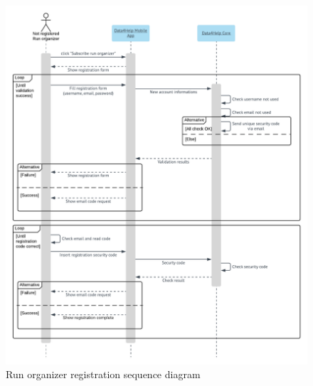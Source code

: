 \begin{figure}[H]
  \includegraphics[width=\textwidth,height=\textheight,keepaspectratio]{assets/sequence/RunOrganizerRegistration.pdf}
  \caption{Run organizer registration sequence diagram}
  \label{fig:RunOrganizerRegistration}
\end{figure}















\newpage
